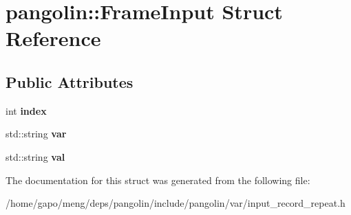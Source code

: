\hypertarget{structpangolin_1_1_frame_input}{}\section{pangolin\+:\+:Frame\+Input Struct Reference}
\label{structpangolin_1_1_frame_input}
\subsection*{Public Attributes}
\begin{DoxyCompactItemize}
\item 
int {\bfseries index}\hypertarget{structpangolin_1_1_frame_input_a59ff81a76f8088ac7123bd944c59ebd1}{}\label{structpangolin_1_1_frame_input_a59ff81a76f8088ac7123bd944c59ebd1}

\item 
std\+::string {\bfseries var}\hypertarget{structpangolin_1_1_frame_input_ab05c7f034c74c2de7712671961944456}{}\label{structpangolin_1_1_frame_input_ab05c7f034c74c2de7712671961944456}

\item 
std\+::string {\bfseries val}\hypertarget{structpangolin_1_1_frame_input_a5efcc26257d1585fc27b46c57deb90f4}{}\label{structpangolin_1_1_frame_input_a5efcc26257d1585fc27b46c57deb90f4}

\end{DoxyCompactItemize}


The documentation for this struct was generated from the following file\+:\begin{DoxyCompactItemize}
\item 
/home/gapo/meng/deps/pangolin/include/pangolin/var/input\+\_\+record\+\_\+repeat.\+h\end{DoxyCompactItemize}
